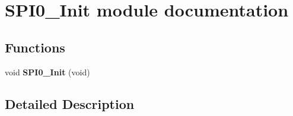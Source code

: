 \hypertarget{group___s_p_i0___init__module}{}\section{S\+P\+I0\+\_\+\+Init module documentation}
\label{group___s_p_i0___init__module}
\subsection*{Functions}
\begin{DoxyCompactItemize}
\item 
void {\bfseries S\+P\+I0\+\_\+\+Init} (void)\hypertarget{group___s_p_i0___init__module_gac385baed8fedb7abe92c2219174cc2a2}{}\label{group___s_p_i0___init__module_gac385baed8fedb7abe92c2219174cc2a2}

\end{DoxyCompactItemize}


\subsection{Detailed Description}
